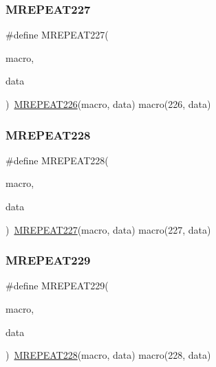 \mbox{\label{group__group__sam0__utils__mrepeat_ga395d7e09979a131155a9b2fcfa84b06e}} 
\subsubsection{\texorpdfstring{MREPEAT227}{MREPEAT227}}
{\footnotesize\ttfamily \#define M\+R\+E\+P\+E\+A\+T227(\begin{DoxyParamCaption}\item[{}]{macro,  }\item[{}]{data }\end{DoxyParamCaption})~\mbox{\hyperlink{group__group__sam0__utils__mrepeat_ga4a34529f9fa47949482c0d37bdacd3c8}{M\+R\+E\+P\+E\+A\+T226}}(macro, data)   macro(226, data)}

\mbox{\label{group__group__sam0__utils__mrepeat_ga1976e9b1599c79c7dd75bdeefb924fba}} 
\subsubsection{\texorpdfstring{MREPEAT228}{MREPEAT228}}
{\footnotesize\ttfamily \#define M\+R\+E\+P\+E\+A\+T228(\begin{DoxyParamCaption}\item[{}]{macro,  }\item[{}]{data }\end{DoxyParamCaption})~\mbox{\hyperlink{group__group__sam0__utils__mrepeat_ga395d7e09979a131155a9b2fcfa84b06e}{M\+R\+E\+P\+E\+A\+T227}}(macro, data)   macro(227, data)}

\mbox{\label{group__group__sam0__utils__mrepeat_ga0f5e93e8a648f55e0d193221c016771a}} 
\subsubsection{\texorpdfstring{MREPEAT229}{MREPEAT229}}
{\footnotesize\ttfamily \#define M\+R\+E\+P\+E\+A\+T229(\begin{DoxyParamCaption}\item[{}]{macro,  }\item[{}]{data }\end{DoxyParamCaption})~\mbox{\hyperlink{group__group__sam0__utils__mrepeat_ga1976e9b1599c79c7dd75bdeefb924fba}{M\+R\+E\+P\+E\+A\+T228}}(macro, data)   macro(228, data)}

